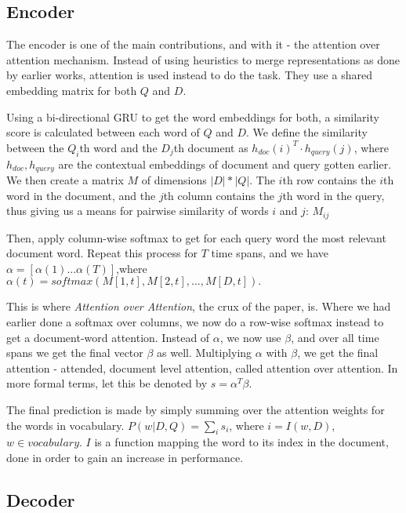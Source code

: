 \documentclass[a4 paper]{article}
\begin{document}
\subsection{Encoder}

The encoder is one of the main contributions, and with it - the attention over
attention mechanism. Instead of using heuristics to merge representations as
done by earlier works, attention is used instead to do the task. They use a 
shared embedding matrix for both $Q$ and $D$. 

\vspace{1em}

Using a bi-directional GRU to get
the word embeddings for both, a similarity score is calculated between each 
word of $Q$ and $D$. We define the similarity between the $Q_i$th word and the
$D_j$th document as $h_{doc}(i)^T\cdot h_{query}(j)$, where $h_{doc}, h_{query}$
are the contextual embeddings of document and query gotten earlier.
We then create a matrix $M$ of dimensions $|D|*|Q|$. The $i$th row contains the
$i$th word in the document, and the $j$th column contains the $j$th word in the
query, thus giving us a means for pairwise similarity of words $i$ and $j$: 
$M_{ij}$

\vspace{1em}

Then, apply column-wise softmax to get for each query word the most relevant
document word. Repeat this process for $T$ time spans, and we have $\alpha =
[\alpha(1) \dotso \alpha(T)]$,where $\alpha(t) = softmax(M[1,t], M[2,t],\dotso,
M[D,t]).$

\vspace{1em}

This is where \textit{Attention over Attention}, the crux of the paper, is.
Where we had earlier done a softmax over columns, we now do a row-wise
softmax instead to get a document-word attention. Instead of $\alpha$, we now
use $\beta$, and over all time spans we get the final vector $\beta$ as well.
Multiplying $\alpha$ with $\beta$, we get the final attention - attended, 
document level attention, called attention over attention. In more formal terms,
let this be denoted by $s=\alpha^T\beta$.

\vspace{1em}

The final prediction is made by simply summing over the attention weights for 
the words in vocabulary. $P(w|D,Q)=\sum_i s_i$, where $i = I(w,D)$, $w\in 
vocabulary$. $I$ is a function mapping the word to its index in the document,
done in order to gain an increase in performance.

\subsection{Decoder}
\end{document}
